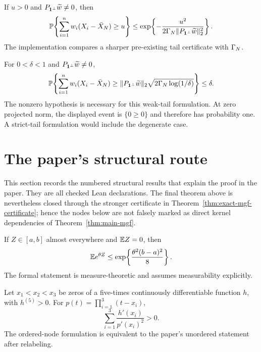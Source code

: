 \begin{theorem}
\label{thm:upper-tail}
\leanok
{}
If $u>0$ and $P_{\mathbf{1}^\perp}\widetilde w\ne0$, then
\[
  \mathbb{P}\!\left\{\sum_{i=1}^n w_i(X_i-\bar X_N)\ge u\right\}
  \le
  \exp\!\left\{-\frac{u^2}
  {2\Gamma_N\|P_{\mathbf{1}^\perp}\widetilde w\|_2^2}\right\}.
\]
The implementation compares a sharper pre-existing tail certificate with
$\Gamma_N$.
\end{theorem}

\begin{corollary}
\label{cor:confidence}
\leanok
{}
For $0<\delta<1$ and $P_{\mathbf{1}^\perp}\widetilde w\ne0$,
\[
\mathbb{P}\!\left\{
  \sum_{i=1}^n w_i(X_i-\bar X_N)
  \ge \|P_{\mathbf{1}^\perp}\widetilde w\|_2
     \sqrt{2\Gamma_N\log(1/\delta)}
\right\}\le\delta.
\]
The nonzero hypothesis is necessary for this weak-tail formulation.  At zero
projected norm, the displayed event is $\{0\ge0\}$ and therefore has
probability one.  A strict-tail formulation would include the degenerate case.
\end{corollary}

\section{The paper's structural route}
\label{sec:paper-route}

This section records the numbered structural results that explain the proof in
the paper.  They are all checked Lean declarations.  The final theorem above is
nevertheless closed through the stronger certificate in
Theorem~\ref{thm:exact-mgf-certificate}; hence the nodes below are not falsely
marked as direct kernel dependencies of Theorem~\ref{thm:main-mgf}.

\begin{lemma}
\label{lem:hoeffding}
\leanok
If $Z\in[a,b]$ almost everywhere and $\mathbb{E} Z=0$, then
\[
  \mathbb{E} e^{\theta Z}\le \exp\!\left\{\frac{\theta^2(b-a)^2}{8}\right\}.
\]
The formal statement is measure-theoretic and assumes measurability explicitly.
\end{lemma}

\begin{lemma}
\label{lem:hermite-sign}
\leanok
Let $x_1<x_2<x_3$ be zeros of a five-times continuously differentiable
function $h$, with $h^{(5)}>0$.  For
$p(t)=\prod_{i=1}^3(t-x_i)$,
\[
  \sum_{i=1}^3\frac{h'(x_i)}{p'(x_i)^2}>0.
\]
The ordered-node formulation is equivalent to the paper's unordered statement
after relabeling.
\end{lemma}

